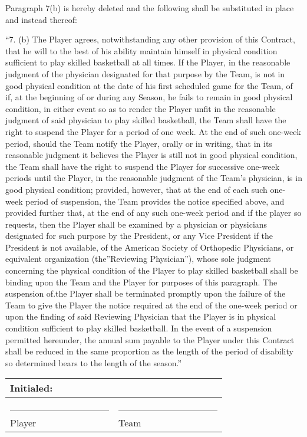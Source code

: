 \documentclass[
]{book}
\begin{document}
Paragraph 7(b) is hereby deleted and the following shall be substituted in place and instead thereof:

``7. (b) The Player agrees, notwithstanding any other provision of this Contract, that he will to the best of his ability maintain himself in physical condition sufficient to play skilled basketball at all times. If the Player, in the reasonable judgment of the physician designated for that purpose by the Team, is not in good physical condition at the date of his first scheduled game for the Team, of if, at the beginning of or during any Season, he fails to remain in good physical condition, in either event so as to render the Player unfit in the reasonable judgment of said physician to play skilled basketball, the Team shall have the right to suspend the Player for a period of one week. At the end of such one-week period, should the Team notify the Player, orally or in writing, that in its reasonable judgment it believes the Player is still not in good physical condition, the Team shall have the right to suspend the Player for successive one-week periods until the Player, in the reasonable judgment of the Team's physician, is in good physical condition; provided, however, that at the end of each such one-week period of suspension, the Team provides the notice specified above, and provided further that, at the end of any such one-week period and if the player so requests, then the Player shall be examined by a physician or physicians designated for such purpose by the President, or any Vice President if the President is not available, of the American Society of Orthopedic Physicians, or equivalent organization (the''Reviewing Physician''), whose sole judgment concerning the physical condition of the Player to play skilled basketball shall be binding upon the Team and the Player for purposes of this paragraph. The suspension of.the Player shall be terminated promptly upon the failure of the Team to give the Player the notice required at the end of the one-week period or upon the finding of said Reviewing Physician that the Player is in physical condition sufficient to play skilled basketball. In the event of a suspension permitted hereunder, the annual sum payable to the Player under this Contract shall be reduced in the same proportion as the length of the period of disability so determined bears to the length of the season.''

\begin{longtable}[]{@{}ll@{}}
\toprule()
Initialed: & \\
\midrule()
\endhead
\_\_\_\_\_\_\_\_\_\_\_\_\_\_ & \_\_\_\_\_\_\_\_\_\_\_\_\_\_ \\
Player & Team \\
\bottomrule()
\end{longtable}
\end{document}
